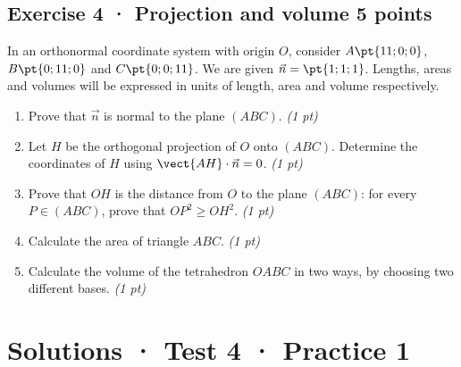 \subsection*{Exercise 4 · Projection and volume \hfill 5 points}In an orthonormal coordinate system with origin $O$, consider $A\pt{11;0;0}$, $B\pt{0;11;0}$ and $C\pt{0;0;11}$. We are given $\vec n=\pt{1;1;1}$. Lengths, areas and volumes will be expressed in units of length, area and volume respectively.

\begin{enumerate}

\item Prove that $\vec n$ is normal to the plane $(ABC)$. \hfill\textit{(1 pt)}

\item Let $H$ be the orthogonal projection of $O$ onto $(ABC)$. Determine the coordinates of $H$ using $\vect{AH}\cdot\vec n=0$. \hfill\textit{(1 pt)}

\item Prove that $OH$ is the distance from $O$ to the plane $(ABC)$: for every $P\in(ABC)$, prove that $OP^2\ge OH^2$. \hfill\textit{(1 pt)}

\item Calculate the area of triangle $ABC$. \hfill\textit{(1 pt)}

\item Calculate the volume of the tetrahedron $OABC$ in two ways, by choosing two different bases. \hfill\textit{(1 pt)}

\end{enumerate}

\ifmxteacher\mxnewpage

\section*{Solutions · Test 4 · Practice 1}\label{cor:6-1}

